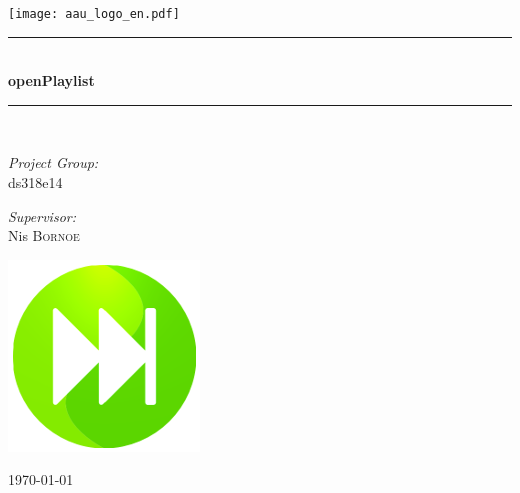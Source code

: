 \begin{titlepage}
\begin{center}
\newcommand{\HRule}{\rule{\linewidth}{0.5mm}}

\texttt{[image: aau\_logo\_en.pdf]}~\\[1cm]



\HRule \\[0.4cm]
{ \huge \bfseries openPlaylist \\[0.4cm] }

\HRule \\[1.5cm]

\begin{minipage}{0.4\textwidth}
\begin{flushleft} \large
\emph{Project Group:}\\
ds318e14
\end{flushleft}
\end{minipage}
\begin{minipage}{0.4\textwidth}
\begin{flushright} \large
\emph{Supervisor:} \\
Nis \textsc{Bornoe}
\end{flushright}
\end{minipage}

\centering
\includegraphics[width=0.5\linewidth]{Images/Icon.png}

\vfill

{\large \today}

\end{center}
\end{titlepage}
